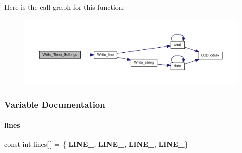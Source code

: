 Here is the call graph for this function\+:
\nopagebreak
\begin{figure}[H]
\begin{center}
\leavevmode
\includegraphics[width=350pt]{a00032_aaa71cdb88431591180cebebb47616028_cgraph}
\end{center}
\end{figure}


\subsubsection{Variable Documentation}
\mbox{\label{a00032_a17dc5deafcb87316c9a0d609704e64a8}} 
\paragraph{lines}
{\footnotesize\ttfamily const int lines[$\,$] = \{\textbf{ L\+I\+N\+E\+\_}, \textbf{ L\+I\+N\+E\+\_}, \textbf{ L\+I\+N\+E\+\_}, \textbf{ L\+I\+N\+E\+\_}\}}

